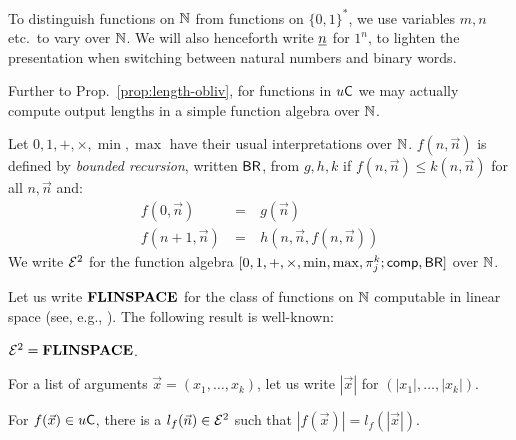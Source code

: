\documentclass{lmcs}
\begin{document}
%
%
%
To distinguish functions on $\mathbb{N}$ from functions on $\{0,1\}^*$, we use variables $m,n$ etc.\ to vary over $\mathbb{N}$.
We will also henceforth write $\underline{n}$ for $1^n$, to lighten the presentation when switching between natural numbers and binary words.


\smallskip

Further to Prop.~\ref{prop:length-obliv}, for functions in $u \mathsf{C}$ we may actually compute output lengths in a simple function algebra over $\mathbb{N}$.
\begin{definition}
	Let $0, 1 ,+, \times, \min , \max $ have their usual interpretations over $\mathbb{N}$.
	$f(n, \vec n)$ is defined by \emph{bounded recursion}, written $\mathsf{BR}$, from $g, h , k$ if $f(n,\vec n) \leq k(n,\vec n)$ for all $n , \vec n$ and:
	\[
	\begin{array}{rcl}
	f(0,\vec n) & \ =\  & g(\vec n) \\
	f(n+1 , \vec n) & \ =\  & h ( n, \vec n , f(n, \vec n))
	\end{array}
	\]
	We write $\mathcal{E}^2$ for the function algebra $ [0, 1, +, \times , \min, \max, \pi^k_j ; \mathsf{comp} , \mathsf{BR} ]$ over $\mathbb{N}$.
\end{definition}


\noindent
Let us write $\mathbf{FLINSPACE}$ for the class of functions on $\mathbb{N}$ computable in linear space (see, e.g., \cite{CloKra02}).
The following result is well-known:
\begin{proposition}
	$\mathcal{E}^2 = \mathbf{FLINSPACE}$.
\end{proposition}

\noindent
For a list of arguments $\vec x = (x_1, \dots , x_k)$, let us write $|\vec x|$ for $(|x_1|, \dots , |x_k|)$.
\begin{lemma}
	\label{lem:computing-lengths}
	For $f(\vec x)\in u \mathsf{C}$,
	there is a $l_f(\vec n) \in \mathcal{E}^2$ such that $ |f(\vec x)| = l_f(|\vec x|)  $.
\end{lemma}
\end{document}
